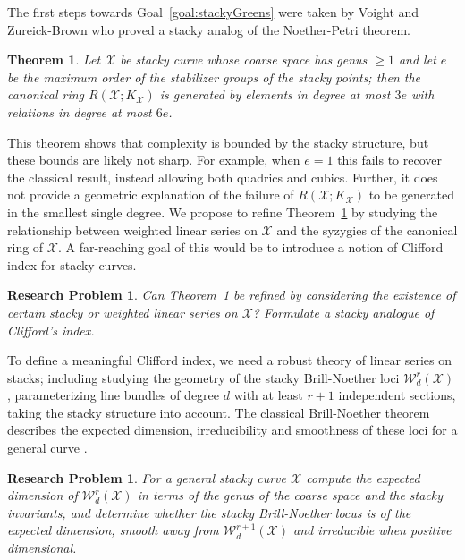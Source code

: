 \documentclass[11pt,reqno]{amsart}
\newtheorem{theorem}[lemma]{Theorem}
\newtheorem{problem}[lemma]{Research Problem}
\theoremstyle{remark}
\newcommand{\cW}{\mathcal{W}}
\newcommand{\cX}{\mathcal{X}}
\begin{document}
The first steps towards Goal~\ref{goal:stackyGreens} were taken by Voight and Zureick-Brown who proved a stacky analog of the Noether-Petri theorem.

\begin{theorem}\cite[Theorem 8.4.1]{voightZurieckBrown22}\label{thm:voight-dzb}
Let $\cX$ be stacky curve whose coarse space has genus $\geq 1$ and let $e$ be the maximum order of the stabilizer groups of the stacky points; then the canonical ring $R(\cX; K_{\cX})$ is  generated by elements in degree at most $3e$ with relations in degree at most $6e$. 
\end{theorem}

This theorem shows that complexity is bounded by the stacky structure, but these bounds are likely not sharp. For example, when $e=1$ this fails to recover the classical result, instead allowing both quadrics and cubics. Further, it does not provide a geometric explanation of the failure of $R(\cX;K_{\cX})$ to be generated in the smallest single degree. We propose to refine Theorem~\ref{thm:voight-dzb} by studying the relationship between weighted linear series on $\cX$ and the syzygies of the canonical ring of $\cX$. A far-reaching goal of this would be to introduce a notion of Clifford index for stacky curves.

\begin{problem}
	Can Theorem~\ref{thm:voight-dzb} be refined by considering the existence of certain stacky or weighted linear series on $\cX$? Formulate a stacky analogue of Clifford's index. 
\end{problem}

To define a meaningful Clifford index, we need a robust theory of linear series on stacks; including studying the geometry of the stacky Brill-Noether loci $\cW_{d}^{r}(\cX)$, parameterizing line bundles of degree $d$ with at least $r+1$ independent sections, taking the stacky structure into account. The classical Brill-Noether theorem describes the expected dimension, irreducibility and smoothness of these loci for a general curve \cite{GH80,FL81,g82}.

\begin{problem}\label{prob:brill}
	For a general stacky curve $\cX$ compute the expected dimension of $\cW_{d}^{r}(\cX)$ in terms of the genus of the coarse space and the stacky invariants, and determine whether the stacky Brill-Noether locus is of the expected dimension, smooth away from $\cW_{d}^{r+1}(\cX)$ and irreducible when positive dimensional.
\end{problem}
	
\end{document}

